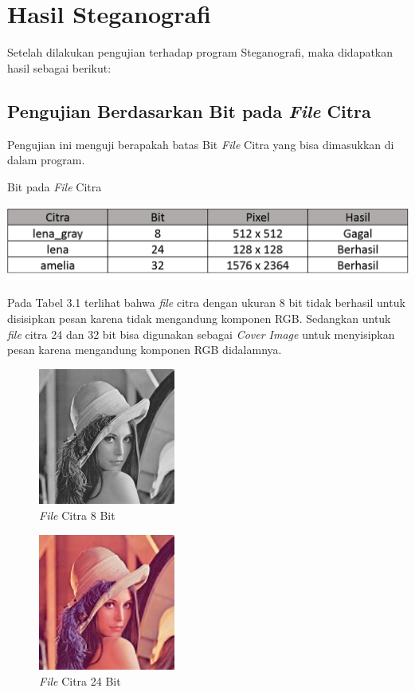 \section{Hasil Steganografi}
Setelah dilakukan pengujian terhadap program Steganografi, maka didapatkan hasil sebagai berikut:
	\subsection{Pengujian Berdasarkan Bit pada \emph{File} Citra}
	Pengujian ini menguji berapakah batas Bit \emph{File} Citra yang bisa dimasukkan di dalam program.
	
	\begin{table}[H]
		\centering
		\caption{Bit pada \emph{File} Citra}
		\includegraphics[width=1.0\textwidth]{gambar/table_bitcitra}
		\label{tabel_bitcitra}
	\end{table}
	
	Pada Tabel 3.1 terlihat bahwa \emph{file} citra dengan ukuran 8 bit tidak berhasil untuk disisipkan pesan karena tidak mengandung komponen RGB. Sedangkan untuk \emph{file} citra 24 dan 32 bit bisa digunakan sebagai \emph{Cover Image} untuk menyisipkan pesan karena mengandung komponen RGB didalamnya.
	
	\begin{figure}[H]
		\centering
		\includegraphics[width=0.4\textwidth]{gambar/matlab/lena_gray}
		\caption{\emph{File} Citra 8 Bit}
		\label{lena_gray8}
	\end{figure}
	
	\begin{figure}[H]
		\centering
		\includegraphics[width=0.4\textwidth]{gambar/matlab/lena}
		\caption{\emph{File} Citra 24 Bit}
		\label{lena24}
	\end{figure}

